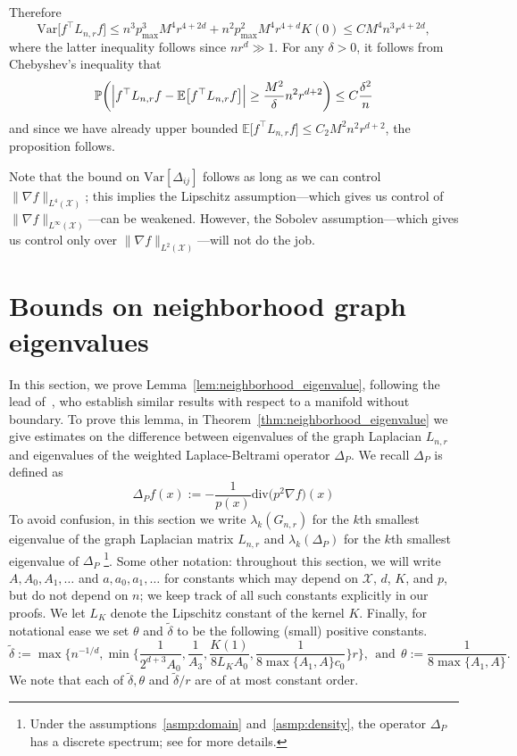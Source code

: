 \documentclass[twoside]{article}
\newcommand{\Var}{\mathrm{Var}}
\newcommand{\1}{\mathbf{1}}
\newcommand{\Lap}{L}
\newcommand{\Xset}{\mathcal{X}}
\newcommand{\Leb}{L}
\newcommand{\Pbb}{\mathbb{P}}
\newcommand{\Ebb}{\mathbb{E}}
\newcommand{\dive}{\mathrm{div}}
\newcommand{\wt}[1]{\widetilde{#1}}
\theoremstyle{definition}
\theoremstyle{remark}
\begin{document}
Therefore
\begin{equation*}
\Var\bigl[f^{\top} \Lap_{n,r} f\bigr] \leq n^3 p_{\max}^3 M^4 r^{4 + 2d} + n^2 p_{\max}^2 M^4 r^{4 + d} K(0) \leq C M^4 n^3r^{4 + 2d},
\end{equation*}
where the latter inequality follows since $nr^d \gg 1$. For any $\delta > 0$, it follows from Chebyshev's inequality that
\begin{equation*}
\Pbb\biggl(\Bigl|f^{\top} \Lap_{n,r} f - \Ebb\bigl[f^{\top} \Lap_{n,r} f\bigr]\Bigr| \geq \frac{M^2}{\delta}n^2 r^{d + 2}\biggr) \leq C\frac{\delta^2}{n}
\end{equation*}
and since we have already upper bounded $\Ebb\bigl[f^{\top} \Lap_{n,r} f\bigr] \leq C_2 M^2 n^2 r^{d + 2}$, the proposition follows. 

Note that the bound on $\Var[\varDelta_{i j}]$ follows as long as we can control $\|\nabla f\|_{\Leb^4(\Xset)}$; this implies the Lipschitz assumption---which gives us control of $\|\nabla f\|_{\Leb^{\infty}(\Xset)}$---can be weakened. However, the Sobolev assumption---which gives us control only over $\|\nabla f\|_{\Leb^2(\Xset)}$---will not do the job. 
\section{Bounds on neighborhood graph eigenvalues}
\label{sec:graph_eigenvalues}
In this section, we prove Lemma~\ref{lem:neighborhood_eigenvalue}, following the lead of~\citet{burago2014,trillos2019,calder2019}, who establish similar results with respect to a manifold without boundary. To prove this lemma, in  Theorem~\ref{thm:neighborhood_eigenvalue} we give estimates on the difference between eigenvalues of the graph Laplacian $L_{n,r}$ and eigenvalues of the weighted Laplace-Beltrami operator $\Delta_P$. We recall $\Delta_P$ is defined as
\begin{equation*}
\Delta_Pf(x) := -\frac{1}{p(x)} \dive\bigl(p^2\nabla f\bigr)(x)
\end{equation*}
To avoid confusion, in this section we write $\lambda_k(G_{n,r})$ for the $k$th smallest eigenvalue of the graph Laplacian matrix $\Lap_{n,r}$ and $\lambda_k(\Delta_P)$ for the $k$th smallest eigenvalue of $\Delta_P$ \footnote{Under the assumptions~\ref{asmp:domain} and~\ref{asmp:density}, the operator $\Delta_P$ has a discrete spectrum; see \citet{garciatrillos18} for more details.}. Some other notation: throughout this section, we will write $A, A_0, A_1,\ldots$ and $a,a_0,a_1,\ldots$ for constants which may depend on $\Xset$, $d$, $K$, and $p$, but do not depend on $n$; we keep track of all such constants explicitly in our proofs. We let $L_K$ denote the Lipschitz constant of the kernel $K$. Finally, for notational ease we set $\theta$ and $\wt{\delta}$ to be the following (small) positive constants.
\begin{equation}
\label{asmp:smallness}
\wt{\delta} := \max\Biggl\{n^{-1/d}, \min\biggl\{\frac{1}{2^{d + 3}A_0}, \frac{1}{A_3}, \frac{K(1)}{8L_KA_0}, \frac{1}{8\max\{A_1,A\}c_0}\biggr\}r\Biggr\},~~\textrm{and}~~
\theta := \frac{1}{8\max\{A_1,A\}}.
\end{equation} 
We note that each of $\wt{\delta}, \theta$ and $\wt{\delta}/r$ are of at most constant order. 
\end{document}
